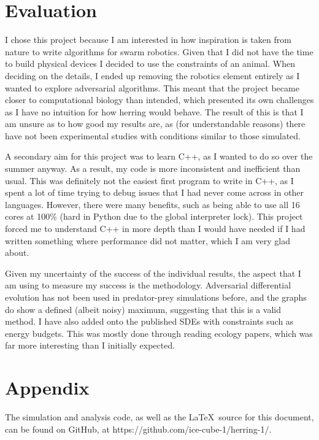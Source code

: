 \documentclass[12pt]{article}
\begin{document}
\section{Evaluation}
I chose this project because I am interested in how inspiration is taken from nature to write algorithms for swarm robotics. Given that I did not have the time to build physical devices I decided to use the constraints of an animal. When deciding on the details, I ended up removing the robotics element entirely as I wanted to explore adversarial algorithms. This meant that the project became closer to computational biology than intended, which presented its own challenges as I have no intuition for how herring would behave. The result of this is that I am unsure as to how good my results are, as (for understandable reasons) there have not been experimental studies with conditions similar to those simulated.\par
A secondary aim for this project was to learn C++, as I wanted to do so over the summer anyway. As a result, my code is more inconsistent and inefficient than usual. This was definitely not the easiest first program to write in C++, as I spent a lot of time trying to debug issues that I had never come across in other languages. However, there were many benefits, such as being able to use all 16 cores at 100\% (hard in Python due to the global interpreter lock). This project forced me to understand C++ in more depth than I would have needed if I had written something where performance did not matter, which I am very glad about.\par
Given my uncertainty of the success of the individual results, the aspect that I am using to measure my success is the methodology. Adversarial differential evolution has not been used in predator-prey simulations before, and the graphs do show a defined (albeit noisy) maximum, suggesting that this is a valid method. I have also added onto the published SDEs with constraints such as energy budgets. This was mostly done through reading ecology papers, which was far more interesting than I initially expected.
\section{Appendix}
The simulation and analysis code, as well as the \LaTeX\ source for this document, can be found on GitHub, at https://github.com/ice-cube-1/herring-1/.
\printbibliography
\end{document}

